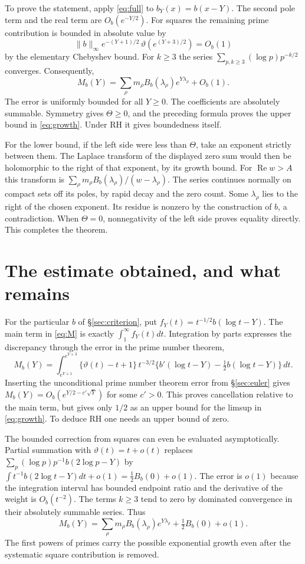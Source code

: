 \documentclass[11pt,letterpaper]{article}
\newcommand{\re}{\operatorname{Re}}\newcommand{\im}{\operatorname{Im}}
\newcommand{\dd}{\,d}\newcommand{\id}{\mathrm{Id}}
\newcommand{\partpage}[2]{\clearpage\section{#1}\label{#2}}
\begin{document}
To prove the statement, apply \eqref{eq:full} to \(b_Y(x)=b(x-Y)\). The second pole term and the real term are \(O_b(e^{-Y/2})\). For squares the remaining prime contribution is bounded in absolute value by
\[
 \|b\|_\infty e^{-(Y+1)/2}\,
      \vartheta(e^{(Y+3)/2})=O_b(1)
\]
by the elementary Chebyshev bound. For \(k\ge3\) the series \(\sum_{p,k\ge3}(\log p)p^{-k/2}\) converges. Consequently,
\[
 M_b(Y)=\sum_\rho m_\rho B_b(\lambda_\rho)e^{Y\lambda_\rho}+O_b(1).
\]
The error is uniformly bounded for all \(Y\ge0\). The coefficients are absolutely summable. Symmetry gives \(\Theta\ge0\), and the preceding formula proves the upper bound in \eqref{eq:growth}. Under RH it gives boundedness itself.

For the lower bound, if the left side were less than \(\Theta\), take an exponent strictly between them. The Laplace transform of the displayed zero sum would then be holomorphic to the right of that exponent, by its growth bound. For \(\re w>A\) this transform is \(\sum_\rho m_\rho B_b(\lambda_\rho)/(w-\lambda_\rho)\). The series continues normally on compact sets off its poles, by rapid decay and the zero count. Some \(\lambda_\rho\) lies to the right of the chosen exponent. Its residue is nonzero by the construction of \(b\), a contradiction. When \(\Theta=0\), nonnegativity of the left side proves equality directly. This completes the theorem.

\partpage{The estimate obtained, and what remains}{sec:estimate}
For the particular \(b\) of \S\ref{sec:criterion}, put \(f_Y(t)=t^{-1/2}b(\log t-Y)\). The main term in \eqref{eq:M} is exactly \(\int_1^\infty f_Y(t)dt\). Integration by parts expresses the discrepancy through the error in the prime number theorem,
\begin{equation}
 M_b(Y)=\int_{e^{Y+1}}^{e^{Y+3}}
   \{\vartheta(t)-t+1\}\,t^{-3/2}
   \{b'(\log t-Y)-\tfrac12 b(\log t-Y)\}\dd t .
 \label{eq:actual}
\end{equation}
Inserting the unconditional prime number theorem error from \S\ref{sec:euler} gives
\(M_b(Y)=O_b(e^{Y/2-c'\sqrt Y})\) for some \(c'>0\). This proves cancellation relative to the main term, but gives only \(1/2\) as an upper bound for the limsup in \eqref{eq:growth}. To deduce RH one needs an upper bound of zero.

The bounded correction from squares can even be evaluated asymptotically. Partial summation with \(\vartheta(t)=t+o(t)\) replaces
\(\sum_p(\log p)p^{-1}b(2\log p-Y)\) by \(\int t^{-1}b(2\log t-Y)dt+o(1)=\tfrac12 B_b(0)+o(1)\). The error is \(o(1)\) because the integration interval has bounded endpoint ratio and the derivative of the weight is \(O_b(t^{-2})\). The terms \(k\ge3\) tend to zero by dominated convergence in their absolutely summable series. Thus
\[
 M_b(Y)=\sum_\rho m_\rho B_b(\lambda_\rho)e^{Y\lambda_\rho}
                  +\tfrac12 B_b(0)+o(1).
\]
The first powers of primes carry the possible exponential growth even after the systematic square contribution is removed.
\end{document}
